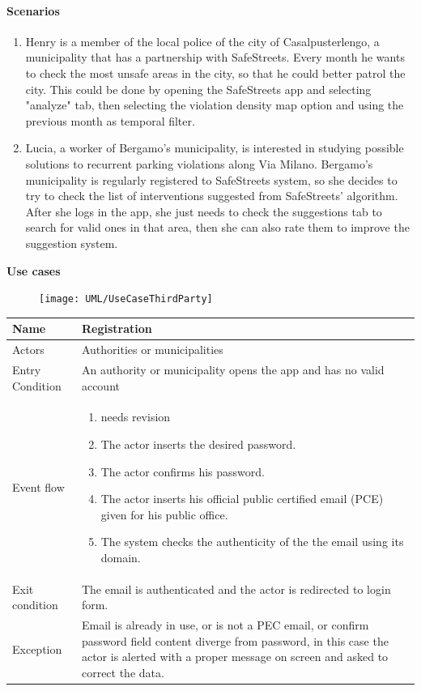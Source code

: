 \paragraph{Scenarios}
\begin{enumerate}
    \item Henry is a member of the local police of the city of Casalpusterlengo, a municipality that has a partnership with SafeStreets. Every month he wants to check the most unsafe areas in the city, so that he could better patrol the city. This could be done by opening the SafeStreets app and selecting "analyze" tab, then selecting the violation density map option and using the previous month as temporal filter.
    
    \item Lucia, a worker of Bergamo's municipality, is interested in studying possible solutions to recurrent parking violations along Via Milano. Bergamo's municipality is regularly registered to SafeStreets system, so she decides to try to check the list of interventions suggested from SafeStreets' algorithm. After she logs in the app, she just needs to check the suggestions tab to search for valid ones in that area, then she can also rate them to improve the suggestion system.
\end{enumerate}
\textbf{Use cases}
\begin{figure}[H]
        \centering
        \texttt{[image: UML/UseCaseThirdParty]}
\end{figure}

\vskip 0.2in
\begin{tabular}{|p{3.1cm}|p{11.6cm}|}
\hline
Name & Registration\\
\hline
Actors & Authorities or municipalities\\
\hline
Entry Condition & An authority or municipality opens the app and has no valid account\\
\hline
Event flow & \begin{enumerate}
				\item {\color{red} needs revision}
                \item The actor inserts the desired password.
                \item The actor confirms his password.
                \item The actor inserts his official public certified email (PCE) given for his public office.
                \item The system checks the authenticity of the the email using its domain.
            \end{enumerate}\\
\hline
Exit condition & The email is authenticated and the actor is redirected to login form.\\
\hline
Exception & Email is already in use, or is not a PEC email, or confirm password field content diverge from password, in this case the actor is alerted with a proper message on screen and asked to correct the data.\\
\hline
\end{tabular}

